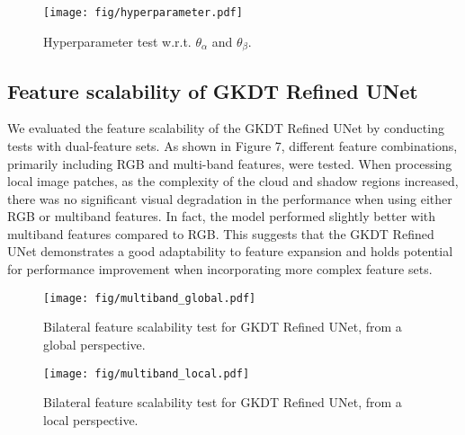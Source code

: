 \documentclass[journal]{IEEEtran}
\begin{document}
\begin{figure*}
  \centering
  \texttt{[image: fig/hyperparameter.pdf]}
  \caption{Hyperparameter test w.r.t. $\theta_{\alpha}$ and $\theta_{\beta}$.}
  \label{fig:hyperparameter}
\end{figure*}

\subsection{Feature scalability of GKDT Refined UNet}
\label{subsec:multiband}
We evaluated the feature scalability of the GKDT Refined UNet by conducting tests with dual-feature sets. As shown in Figure 7, different feature combinations, primarily including RGB and multi-band features, were tested. When processing local image patches, as the complexity of the cloud and shadow regions increased, there was no significant visual degradation in the performance when using either RGB or multiband features. In fact, the model performed slightly better with multiband features compared to RGB. This suggests that the GKDT Refined UNet demonstrates a good adaptability to feature expansion and holds potential for performance improvement when incorporating more complex feature sets.
\begin{figure*}
  \centering
  \texttt{[image: fig/multiband\_global.pdf]}
  \caption{Bilateral feature scalability test for GKDT Refined UNet, from a global perspective.}
  \label{fig:multibandglobal}
\end{figure*}

\begin{figure*}
  \centering
  \texttt{[image: fig/multiband\_local.pdf]}
  \caption{Bilateral feature scalability test for GKDT Refined UNet, from a local perspective.}
  \label{fig:multibandlocal}
\end{figure*}
\end{document}

